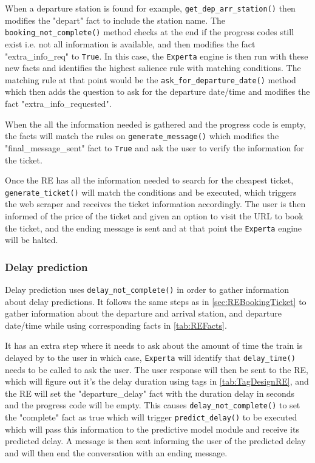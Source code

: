 \documentclass[11pt]{article}
\newcommand{\code}[1]{{\texttt{#1}}}
\begin{document}
        When a departure station is found for example, \code{get\_dep\_arr\_station()} then modifies the "depart" fact to include the station name. The \code{booking\_not\_complete()} method checks at the end if the progress codes still exist i.e. not all information is available, and then modifies the fact "extra\_info\_req" to \code{True}. In this case, the \code{Experta} engine is then run with these new facts and identifies the highest salience rule with matching conditions. The matching rule at that point would be the  \code{ask\_for\_departure\_date()} method which then adds the question to ask for the departure date/time and modifies the fact "extra\_info\_requested".
        
        When the all the information needed is gathered and the progress code is empty, the facts will match the rules on \code{generate\_message()} which modifies the "final\_message\_sent" fact to \code{True} and ask the user to verify the information for the ticket. 
        
        Once the RE has all the information needed to search for the cheapest ticket, \code{generate\_ticket()} will match the conditions and be executed, which triggers the web scraper and receives the ticket information accordingly. The user is then informed of the price of the ticket and given an option to visit the URL to book the ticket, and the ending message is sent and at that point the \code{Experta} engine will be halted.
        
        \subsubsection{Delay prediction}
        Delay prediction uses \code{delay\_not\_complete()} in order to gather information about delay predictions. It follows the same steps as in \cref{sec:REBookingTicket} to gather information about the departure and arrival station, and departure date/time while using corresponding facts in \cref{tab:REFacts}. 
        
        It has an extra step where it needs to ask about the amount of time the train is delayed by to the user in which case, \code{Experta} will identify that \code{delay\_time()} needs to be called to ask the user. The user response will then be sent to the RE, which will figure out it's the delay duration using tags in \cref{tab:TagDesignRE}, and the RE will set the "departure\_delay" fact with the duration delay in seconds and the progress code will be empty. This causes \code{delay\_not\_complete()} to set the "complete" fact as true which will trigger \code{predict\_delay()} to be executed which will pass this information to the predictive model module and receive its predicted delay. A message is then sent informing the user of the predicted delay and will then end the conversation with an ending message.
        
\end{document}
